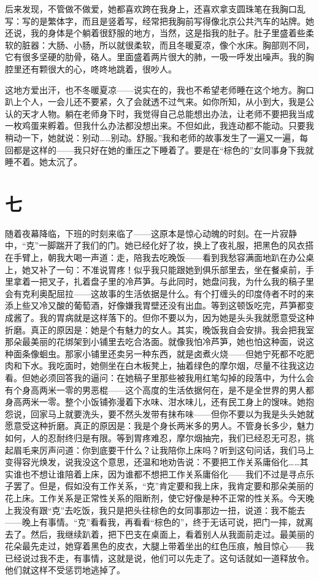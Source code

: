 后来发现，不管做不做爱，她都喜欢跨在我身上，还喜欢拿支圆珠笔在我胸口乱写：写的是繁体字，而且是竖着写，经常把我胸前写得像北京公共汽车的站牌。她还说，我的身体是个躺着很舒服的地方，当然，这是指我的肚子。肚子里盛着些柔软的脏器：大肠、小肠，所以就很柔软，而且冬暖夏凉，像个水床。胸部则不同，它有很多坚硬的肋骨，硌人。里面盛着两片很大的肺，一吸一呼发出噪声。我的胸腔里还有颗很大的心，咚咚地跳着，很吵人。 

这地方爱出汗，也不冬暖夏凉——说实在的，我也不希望老师睡在这个地方。胸口趴上个人，一会儿还不要紧，久了会就透不过气来。如你所知，从小到大，我是公认的天才人物。躺在老师身下时，我觉得自己总能想出办法，让老师不要把我当成一枚鸡蛋来孵着。但我什么办法都没想出来。不但如此，我连动都不能动。只要我稍动一下，她就说：别动……别动。舒服。”我和老师的故事发生了一遍又一遍，每回都是这样的——我只好在她的重压之下睡着了。要是在“棕色的”女同事身下我就睡不着。她太沉了。 

\section*{七} 

随着夜幕降临，下班的时刻来临了——这原本是惊心动魄的时刻。在一片寂静中，“克”一脚踹开了我们的门。她已经化好了妆，换上了夜礼服，把黑色的风衣搭在手臂上，朝我大喝一声道：走，陪我去吃晚饭——看到我愁容满面地趴在办公桌上，她又补了一句：不准说胃疼！似乎我只能跟她到俱乐部里去，坐在餐桌前，手里拿着一把叉子，扎着盘子里的冷芦笋。与此同时，她盘问我，为什么我的稿子里会有克利奥配屈拉——这故事的生活依据是什么。有个打缠头的印度侍者不时的来添上些又冷又酸的葡萄酒，好像嫌我胃壁还没有出血。等到这顿饭吃完，芦笋都变成酱了。我的胃病就是这样落下的。但你不要以为，因为她是头头我就愿意受这种折磨。真正的原因是：她是个有魅力的女人。其实，晚饭我自会安排。我会把我室那朵最美丽的花绑架到小铺里去吃合洛面。就像我怕冷芦笋，她也怕这种面，说这种面条像蛔虫。那家小铺里还卖另一种东西，就是卤煮火烧——但她宁死都不吃肥肉和下水。我吃面时，她侧坐在白木板凳上，抽着绿色的摩尔烟，尽量不往我这边看。但她必须回答我的逼问：在她稿子里那些被我用红笔勾掉的段落中，为什么会有个身高两米一零的男恶棍——这个高度的生活依据何在，是不是全世界的男人都身高两米一零。整个小饭铺弥漫着下水味、泔水味儿，还有民工身上的馊味。她抱怨说，回家马上就要洗头，要不然头发带有抹布味——但你不要以为我是头头她就愿意受这种折磨。真正的原因是：我是个身长两米多的男人。不管身长多少，魅力如何，人的忍耐终归是有限。等到胃疼难忍，摩尔烟抽完，我们已经忍无可忍，挑起眉毛来厉声问道：你到底要干什么？让我陪你上床吗？听到这句问话，我们马上变得容光焕发，说我没这个意思，还温和地劝告说：不要把工作关系庸俗化……其实谁也不想让谁陪着上床，因为谁都不想把工作关系庸俗化——我们不过是寻点乐子罢了。但是，假如没有工作关系，“克”肯定要和我上床，我肯定要和那朵美丽的花上床。工作关系是正常性关系的阻断剂，使它好像是种不正常的性关系。今天晚上我没有跟“克”去吃饭，我只是把头往棕色的女同事那边一扭，说道：我不能去——晚上有事情。“克”看看我，再看看“棕色的”，终于无话可说，把门一摔，就离去了。然后，我继续趴着，把下巴支在桌面上，看着别人从我面前走过。最美丽的花朵最先走过，她穿着黑色的皮衣，大腿上带着坐出的红色压痕，触目惊心——我已经说过我不走，有事情，这就是说，他们可以先走了。这句话就如一道释放令。他们就这样不受惩罚地逃掉了。 

